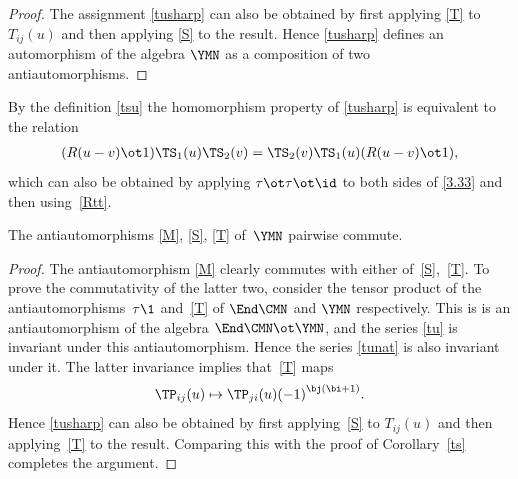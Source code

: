\begin{proof}
The assignment \eqref{tusharp} can also be obtained by first applying
\eqref{T} to $T_{ij}(u)$ and then applying \eqref{S} to the result.
Hence \eqref{tusharp} defines an automorphism of the algebra
$\YMN$ as a composition of two antiautomorphisms.
\end{proof}

By the definition \eqref{tsu} the homomorphism property of %
\eqref{tusharp} is equivalent to the relation
\begin{gather}
\label{3.333}
(R (u-v)\ot1) \TS_1(u) \TS_2(v)=
\TS_2(v) \TS_1(u)(R (u-v)\ot1),
\end{gather}
which can also be obtained by applying
$\tau\ot\tau\ot\id$ to both sides of \eqref{3.33}
and then using~\eqref{Rtt}.

\begin{Proposition}\label{mst}
The antiautomorphisms \eqref{M}, \eqref{S}, \eqref{T} of~$\YMN$ pairwise commute.
\end{Proposition}

\begin{proof}The antiautomorphism \eqref{M} clearly commutes with either of~\eqref{S},~\eqref{T}.
To prove the commutativity of the latter two, consider the tensor product of the antiautomorphisms~$\tau\1$ and~\eqref{T}
of $\End\CMN$ and $\YMN$ respectively. This is
is an antiautomorphism of the
algebra $\End\CMN\ot\YMN $, and the series \eqref{tu} is invariant
under this antiautomorphism. Hence the series \eqref{tunat}
is also invariant under it.
The latter invariance implies that~\eqref{T} maps
\begin{gather*}%
\TP_{ij}(u)\mapsto\TP_{ji}(u) {(-1)}^{\bj ( \bi + 1)} .
\end{gather*}
Hence \eqref{tusharp} can also be obtained by first applying~\eqref{S} to $T_{ij}(u)$ and then applying~\eqref{T} to the result.
Comparing this with the proof of Corollary~\ref{ts} completes the argument.
\end{proof}

